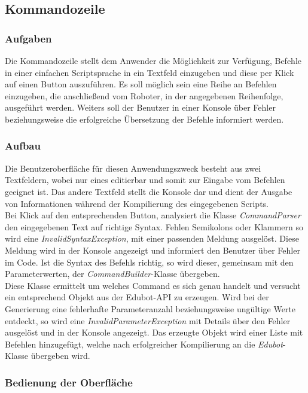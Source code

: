 
\newpage
\subsection{Kommandozeile}

\subsubsection{Aufgaben}
Die Kommandozeile stellt dem Anwender die Möglichkeit zur Verfügung, Befehle in einer einfachen Scriptsprache in ein Textfeld einzugeben und diese per Klick auf einen Button auszuführen. Es soll möglich sein eine Reihe an Befehlen einzugeben, die anschließend vom Roboter, in der angegebenen Reihenfolge, ausgeführt werden. Weiters soll der Benutzer in einer Konsole über Fehler beziehungsweise die erfolgreiche Übersetzung der Befehle informiert werden.

\subsubsection{Aufbau}
Die Benutzeroberfläche für diesen Anwendungszweck besteht aus zwei Textfeldern, wobei nur eines editierbar und somit zur Eingabe vom Befehlen geeignet ist. Das andere Textfeld stellt die Konsole dar und dient der Ausgabe von Informationen während der Kompilierung des eingegebenen Scripts. \\
Bei Klick auf den entsprechenden Button, analysiert die Klasse \textit{CommandParser} den eingegebenen Text auf richtige Syntax. Fehlen Semikolons oder Klammern so wird eine \textit{InvalidSyntaxException}, mit einer passenden Meldung ausgelöst. Diese Meldung wird in der Konsole angezeigt und informiert den Benutzer über Fehler im Code. Ist die Syntax des Befehls richtig, so wird dieser, gemeinsam mit den Parameterwerten, der \textit{CommandBuilder}-Klasse übergeben.\\
Diese Klasse ermittelt um welches Command es sich genau handelt und versucht ein entsprechend Objekt aus der Edubot-API zu erzeugen. Wird bei der Generierung eine fehlerhafte Parameteranzahl beziehungsweise ungültige Werte entdeckt, so wird eine \textit{InvalidParameterException} mit Details über den Fehler ausgelöst und in der Konsole angezeigt. Das erzeugte Objekt wird einer Liste mit Befehlen hinzugefügt, welche nach erfolgreicher Kompilierung an die \textit{Edubot}-Klasse übergeben wird.

\subsubsection{Bedienung der Oberfläche}

